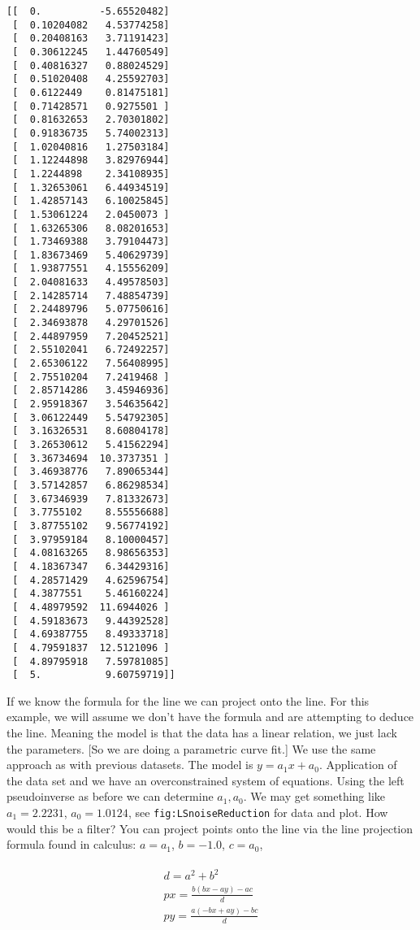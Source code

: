 \begin{verbatim}
[[  0.          -5.65520482]
 [  0.10204082   4.53774258]
 [  0.20408163   3.71191423]
 [  0.30612245   1.44760549]
 [  0.40816327   0.88024529]
 [  0.51020408   4.25592703]
 [  0.6122449    0.81475181]
 [  0.71428571   0.9275501 ]
 [  0.81632653   2.70301802]
 [  0.91836735   5.74002313]
 [  1.02040816   1.27503184]
 [  1.12244898   3.82976944]
 [  1.2244898    2.34108935]
 [  1.32653061   6.44934519]
 [  1.42857143   6.10025845]
 [  1.53061224   2.0450073 ]
 [  1.63265306   8.08201653]
 [  1.73469388   3.79104473]
 [  1.83673469   5.40629739]
 [  1.93877551   4.15556209]
 [  2.04081633   4.49578503]
 [  2.14285714   7.48854739]
 [  2.24489796   5.07750616]
 [  2.34693878   4.29701526]
 [  2.44897959   7.20452521]
 [  2.55102041   6.72492257]
 [  2.65306122   7.56408995]
 [  2.75510204   7.2419468 ]
 [  2.85714286   3.45946936]
 [  2.95918367   3.54635642]
 [  3.06122449   5.54792305]
 [  3.16326531   8.60804178]
 [  3.26530612   5.41562294]
 [  3.36734694  10.3737351 ]
 [  3.46938776   7.89065344]
 [  3.57142857   6.86298534]
 [  3.67346939   7.81332673]
 [  3.7755102    8.55556688]
 [  3.87755102   9.56774192]
 [  3.97959184   8.10000457]
 [  4.08163265   8.98656353]
 [  4.18367347   6.34429316]
 [  4.28571429   4.62596754]
 [  4.3877551    5.46160224]
 [  4.48979592  11.6944026 ]
 [  4.59183673   9.44392528]
 [  4.69387755   8.49333718]
 [  4.79591837  12.5121096 ]
 [  4.89795918   7.59781085]
 [  5.           9.60759719]]
\end{verbatim}

If we know the formula for the line we can project onto the line. For
this example, we will assume we don't have the formula and are
attempting to deduce the line. Meaning the model is that the data has a
linear relation, we just lack the parameters. {[}So we are doing a
parametric curve fit.{]} We use the same approach as with previous
datasets. The model is \(y = a_1x + a_0\). Application of the data set
and we have an overconstrained system of equations. Using the left
pseudoinverse as before we can determine \(a_1, a_0\). We may get
something like \(a_1=2.2231\), \(a_0 =  1.0124\), see
\texttt{fig:LSnoiseReduction} for data and plot. How would this be a
filter? You can project points onto the line via the line projection
formula found in calculus: \(a = a_1\), \(b = -1.0\), \(c = a_0\),

\[\begin{aligned}
\begin{matrix}
\displaystyle d = a^2+b^2\\[5pt]
\displaystyle px = \frac{b(bx - ay)-ac}{d} \\[5pt]
\displaystyle py = \frac{a(-bx+ay)-bc}{d}
\end{matrix}
\end{aligned}\]

